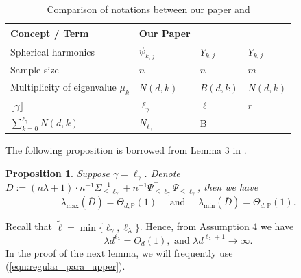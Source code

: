 \documentclass{article}
\theoremstyle{plain}
\newtheorem{proposition}[theorem]{Proposition}
\theoremstyle{definition}
\theoremstyle{remark}
\begin{document}
\begin{appendix}
\begin{table}[t]
\centering
\caption{Comparison of notations between our paper and \cite{ghorbani2021linearized, xiao2022precise}}
\label{tab_comparison_of_notations}
\begin{tabular}{l l l l}
\hline
\textbf{Concept / Term} & \textbf{Our Paper} & \cite{ghorbani2021linearized} & \cite{xiao2022precise} \\
\hline
Spherical harmonics & $\psi_{k, j}$ & $Y_{k, j}$ & $Y_{k, j}$ \\
\vspace{3pt}
Sample size & $n$ & $n$ & $m$ \\
\vspace{3pt}
Multiplicity of eigenvalue $\mu_k$ & $N(d, k)$ & $B(d, k)$ & $N(d, k)$ \\
\vspace{3pt}
$\lfloor \gamma \rfloor$ & $\ell_{\gamma}$ & $\ell$ & $r$ \\
\vspace{3pt}
$\sum_{k=0}^{\ell_{\gamma}} N(d, k)$ & $N_{\ell_{\gamma}}$ & B &  \\
\hline
\end{tabular}
\end{table}















The following proposition is borrowed from Lemma 3 in \cite{xiao2022precise}.

\begin{proposition}\label{prop_lemma_3_in_xiao}
    Suppose $\gamma = \ell_{\gamma}$. 
    Denote $\overline{D}:= (n\lambda + 1) \cdot n^{-1}\Sigma_{\leq \ell_{\gamma}}^{-1} + n^{-1}\Psi_{\leq \ell_{\gamma}}^{\top} \Psi_{\leq \ell_{\gamma}}$,
    then we have 
    $$
    \lambda_{\text{max}} \left(  \overline{D} \right)  = \Theta_{d, \mathbb{P}}(1)
    \quad \text{ and } \quad
    \lambda_{\text{min}} \left(  \overline{D} \right) = \Theta_{d, \mathbb{P}}(1).
    $$
\end{proposition}




Recall that $\tilde{\ell} =\min\{\ell_{\gamma}, \ell_{\lambda}\}$. Hence, from Assumption 4 we have
\begin{equation}\label{eqn:regular_para_upper}
   \lambda d^{\ell_{\lambda}} = O_{d}(1),\text{ and }  \lambda d^{\ell_{\lambda}+1}\rightarrow \infty. 
\end{equation}
In the proof of the next lemma, we will frequently use (\ref{eqn:regular_para_upper}).



\end{appendix}
\end{document}

